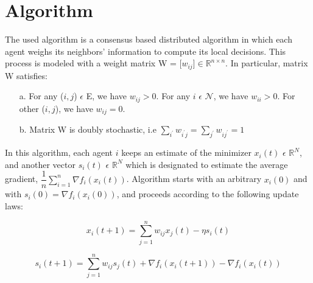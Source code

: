 \documentclass[a4paper,11pt,oneside]{book}
\begin{document}
\section{Algorithm}
The used algorithm is a consensus based distributed algorithm in which each agent weighs its neighbors' information to compute its local decisions. This process is modeled with a weight matrix W = [$w_{ij}$]$\in \mathbb{R}^{{n}\times{n}}$. In particular, matrix W satisfies:
\begin{enumerate}
\item [a.] For any ($i, j$) $\epsilon$ E, we have $w_{ij} > 0$. For any $i$ $\epsilon$ $\mathcal{N}$, we have $w_{ii} > 0$. For other ($i, j$), we have $w_{ij} = 0$.
\item [b.] Matrix W is doubly stochastic, i.e $\sum\limits_{i^{'}}w_{i^{'}j} = \sum\limits_{j^{'}}w_{ij^{'}} = 1$
\end{enumerate}
In this algorithm, each agent $i$ keeps an estimate of the minimizer $ x_{i}(t)$ $\epsilon $  $\mathbb{R}^{N}$, and another vector $ s_{i}(t)$ $\epsilon $  $\mathbb{R}^{N}$ which is designated to estimate the average gradient, $\dfrac{1}{n} \sum\limits_{i=1}^{n} \nabla f_i (x_{i}(t)) $. Algorithm starts with an arbitrary $x_i(0)$ and with $ s_{i}(0) = \nabla f_i(x_i(0))$, and proceeds according to the following update laws:

\begin{equation}
x_i(t+1) = \sum\limits_{j=1}^{n} w_{ij} x_j(t)-\eta s_i(t)
\end{equation} 

\begin{equation}
s_i(t+1) = \sum\limits_{j=1}^{n} w_{ij} s_j(t) + \nabla f_i(x_i(t+1))-\nabla f_i(x_i(t))
\end{equation}

\end{document}

